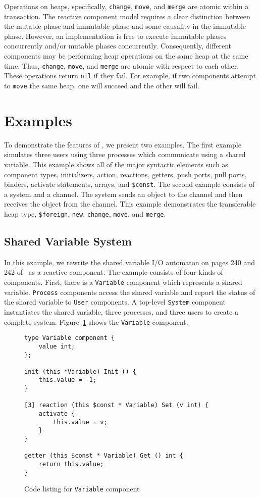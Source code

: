 Operations on heaps, specifically, \verb+change+, \verb+move+, and \verb+merge+ are atomic within a transaction.
The reactive component model requires a clear distinction between the mutable phase and immutable phase and some causality in the immutable phase.
However, an implementation is free to execute immutable phases concurrently and/or mutable phases concurrently.
Consequently, different components may be performing heap operations on the same heap at the same time.
Thus, \verb+change+, \verb+move+, and \verb+merge+ are atomic with respect to each other.
These operations return \verb+nil+ if they fail.
For example, if two components attempt to \verb+move+ the same heap, one will succeed and the other will fail.

\section{Examples}

To demonstrate the features of \rcgo{}, we present two examples.
The first example simulates three users using three processes which communicate using a shared variable.
This example shows all of the major syntactic elements such as component types, initializers, action, reactions, getters, push ports, pull ports, binders, activate statements, arrays, and \verb+$const+.
The second example consists of a system and a channel.
The system sends an object to the channel and then receives the object from the channel.
This example demonstrates the transferable heap type, \verb+$foreign+, \verb+new+, \verb+change+, \verb+move+, and \verb+merge+.

\subsection{Shared Variable System}

In this example, we rewrite the shared variable I/O automaton on pages 240 and 242 of~\cite{nancy1996distributed} as a reactive component.
The example consists of four kinds of components.
First, there is a \verb+Variable+ component which represents a shared variable.
\verb+Process+ components access the shared variable and report the status of the shared variable to \verb+User+ components.
A top-level \verb+System+ component instantiates the shared variable, three processes, and three users to create a complete system.
Figure~\ref{variable} shows the \verb+Variable+ component.

\begin{figure}[h]
\begin{verbatim}
type Variable component {
    value int;
};

init (this *Variable) Init () {
    this.value = -1;
}

[3] reaction (this $const * Variable) Set (v int) {
    activate {
        this.value = v;
    }
}

getter (this $const * Variable) Get () int {
    return this.value;
}
\end{verbatim}
\cprotect\caption{Code listing for \verb+Variable+ component}
\label{variable}
\end{figure}

